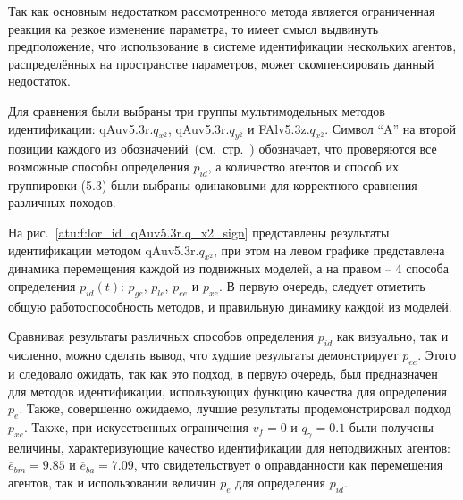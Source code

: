 Так как основным недостатком рассмотренного метода является
ограниченная реакция ка резкое изменение параметра,
то имеет смысл выдвинуть предположение,
что использование в системе идентификации нескольких агентов,
распределённых на пространстве параметров, может
скомпенсировать данный недостаток.


Для сравнения были выбраны три группы мультимодельных методов идентификации:
qAuv5.3r.$q_{x^2}$,
qAuv5.3r.$q_{y^2}$ и
FAlv5.3z.$q_{x^2}$. Символ ``A'' на второй позиции каждого из
обозначений~(см.~стр.~\pageref{atu:id_classification})
обозначает, что проверяются
все возможные способы определения $p_{id}$,
а количество агентов и способ их группировки (5.3) были выбраны
одинаковыми для корректного сравнения различных походов.


На рис.~\ref{atu:f:lor_id_qAuv5.3r.q_x2_sign} представлены результаты идентификации
методом qAuv5.3r.$q_{x^2}$, при этом на левом графике представлена
динамика перемещения каждой из подвижных моделей,
а на правом -- 4 способа определения $p_{id}(t)$:
$p_{ge}$, $p_{le}$, $p_{ee}$ и $p_{xe}$.
В первую очередь, следует отметить общую работоспособность
методов, и правильную динамику каждой из моделей.


Сравнивая результаты различных способов определения
$p_{id}$ как визуально, так и численно, можно сделать
вывод, что худшие результаты демонстрирует $p_{ee}$.
Этого и следовало ожидать, так как это подход, в первую очередь,
был предназначен для методов идентификации, использующих
функцию качества для определения $p_e$.
Также, совершенно ожидаемо, лучшие результаты продемонстрировал
подход $p_{xe}$. Также, при искусственных ограничения
$v_f=0$ и $q_\gamma=0.1$ были получены величины,
характеризующие качество идентификации для неподвижных агентов:
$\overline{e}_{bm}=9.85$
и
$\overline{e}_{ba}=7.09$, что свидетельствует
о оправданности как перемещения агентов,
так и использовании величин $p_e$ для определения $p_{id}$.



